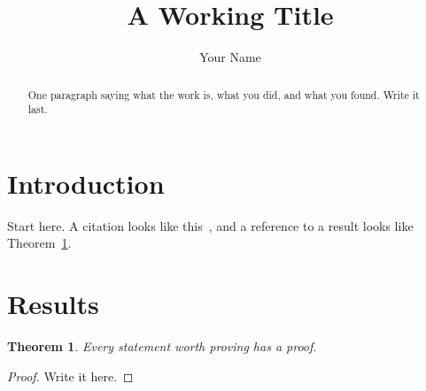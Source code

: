 \documentclass{amsart}
\newtheorem{theorem}{Theorem}[section]
\theoremstyle{definition}
\theoremstyle{remark}
\begin{document}
\title{A Working Title}
\author{Your Name}
\address{Your Institution, City, Country}


\begin{abstract}
One paragraph saying what the work is, what you did, and what you found.
Write it last.
\end{abstract}

\maketitle

\section{Introduction}
\label{sec:introduction}

Start here.  A citation looks like this~\cite{knuth1984}, and a reference to
a result looks like Theorem~\ref{thm:example}.

\section{Results}

\begin{theorem}
  \label{thm:example}
  Every statement worth proving has a proof.
\end{theorem}

\begin{proof}
  Write it here.
\end{proof}



\end{document}
